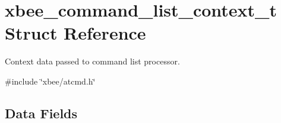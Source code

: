 \hypertarget{structxbee__command__list__context__t}{}\section{xbee\+\_\+command\+\_\+list\+\_\+context\+\_\+t Struct Reference}
\label{structxbee__command__list__context__t}


Context data passed to command list processor.  




{\ttfamily \#include \char`\"{}xbee/atcmd.\+h\char`\"{}}

\subsection*{Data Fields}
